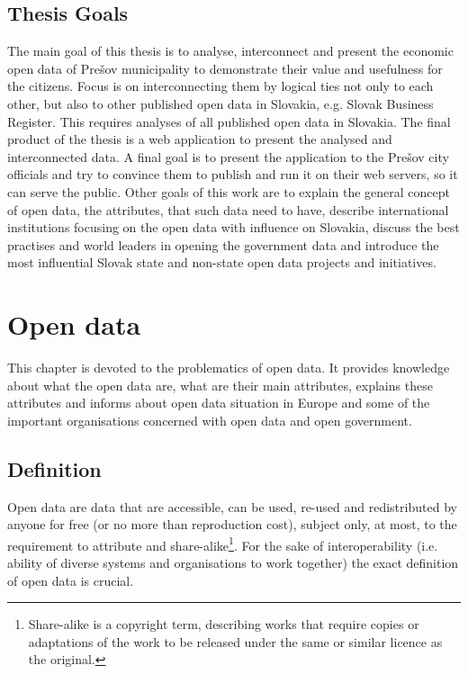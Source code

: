 \documentclass[thesis=B,english]{FITthesis}[2012/06/26]
\begin{document}
\begin{introduction}
	\section*{Thesis Goals}
	The main goal of this thesis is to analyse, interconnect and present the economic open data of Prešov municipality to demonstrate their value and usefulness for the citizens. Focus is on interconnecting them by logical ties not only to each other, but also to other published open data in Slovakia, e.g. Slovak Business Register. This requires analyses of all published open data in Slovakia. The final product of the thesis is a web application to present the analysed and interconnected data. A final goal is to present the application to the Prešov city officials and try to convince them to publish and run it on their web servers, so it can serve the public. Other goals of this work are to explain the general concept of open data, the attributes, that such data need to have, describe international institutions focusing on the open data with influence on Slovakia, discuss the best practises and world leaders in opening the government data and introduce the most influential Slovak state and non-state open data projects and initiatives.

\end{introduction}

\chapter{Open data}
	This chapter is devoted to the problematics of open data. It provides knowledge about what the open data are, what are their main attributes, explains these attributes and informs about open data situation in Europe and some of the important organisations concerned with open data and open government.
	\section{Definition}
	Open data are data that are accessible, can be used, re-used and redistributed by anyone for free (or no more than reproduction cost), subject only, at most, to the requirement to attribute and share-alike\footnote{Share-alike is a copyright term, describing works that require copies or adaptations of the work to be released under the same or similar licence as the original.}. For the sake of interoperability (i.e. ability of diverse systems and organisations to work together) the exact definition of open data is crucial. \cite{opendatahandbook} 
\end{document}
